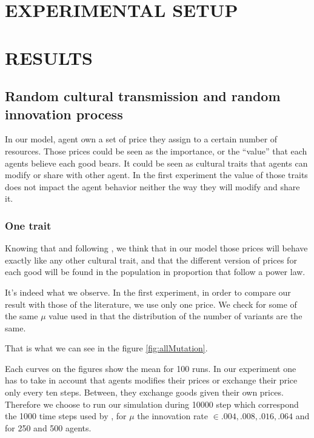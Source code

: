 \documentclass{wscpaperproc}
\begin{document}
\section{EXPERIMENTAL SETUP}

\section{RESULTS}
\subsection{Random cultural transmission and random innovation process}
In our model, agent own a set of price they assign to a certain number of resources. Those prices could be seen as the importance, or the ``value''  that each agents believe each good bears. It could be seen as cultural traits that agents can modify or share with other agent. In the first experiment the value of those traits does not impact the agent  behavior neither the way they will modify and share it. 
\subsubsection{One trait}
Knowing that and following \cite{bentley_random_2004,bentley_specialisation_2005,mesoudi_random_2009}, we think that in our model those prices will behave exactly like any other cultural trait, and that the different version of prices for each good will be found in the population in proportion that follow a power law.

It's indeed what we observe. In the first experiment, in order to compare our result with those of the literature, we use only one price. We check for some of the same $\mu$ value used in \cite{bentley_specialisation_2005,mesoudi_random_2009} that the distribution of the number of variants are the same. 

That is what we can see in the figure \ref{fig:allMutation}.

Each curves on the figures show the mean for 100 runs. In our experiment one has to take in account that agents modifies their prices or exchange their price only every ten steps. Between, they exchange goods given their own prices. Therefore we choose to run our simulation during 10000 step which correspond the 1000 time steps used by \cite{bentley_random_2004,mesoudi_random_2009}, for $\mu$ the innovation rate $\in {.004,.008,.016,.064}$ and for 250 and 500 agents.
\end{document}
